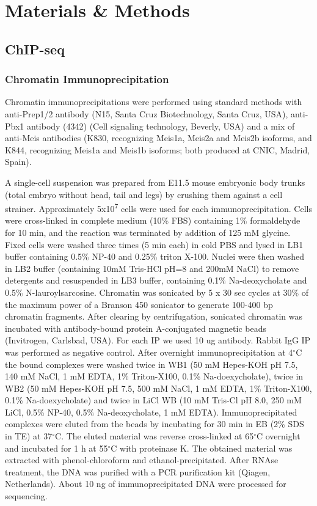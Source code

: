 \chapter{Materials \& Methods}
\thispagestyle{cleared}
\cleardoublepage
\label{chp:methods}

\section{ChIP-seq}
\subsection{Chromatin Immunoprecipitation}

Chromatin immunoprecipitations were performed using standard methods with anti-Prep1/2 antibody (N15, Santa Cruz Biotechnology, Santa Cruz, USA), anti-Pbx1 antibody (4342) (Cell signaling technology, Beverly, USA) and a mix of anti-Meis antibodies (K830, recognizing Meis1a, Meis2a and Meis2b isoforms, and K844, recognizing Meis1a and Meis1b isoforms; both produced at CNIC, Madrid, Spain). %

A single-cell suspension was prepared from E11.5 mouse embryonic body trunks (total embryo without head, tail and legs) by crushing them against a cell strainer. Approximately 5x10\textsuperscript{7} cells were used for each immunoprecipitation. Cells were cross-linked in complete medium (10\% FBS) containing 1\% formaldehyde for 10 min, and the reaction was terminated by addition of 125 mM glycine. Fixed cells were washed three times (5 min each) in cold PBS and lysed in LB1 buffer containing 0.5\% NP-40 and 0.25\% triton X-100. Nuclei were then washed in LB2 buffer (containing 10mM Tris-HCl pH=8 and 200mM NaCl) to remove detergents and resuspended in LB3 buffer, containing 0.1\% Na-deoxycholate and 0.5\% N-lauroylsarcosine. Chromatin was sonicated by 5 x 30 sec cycles at 30\% of the maximum power of a Branson 450 sonicator to generate 100-400 bp chromatin fragments. After clearing by centrifugation, sonicated chromatin was incubated with antibody-bound protein A-conjugated magnetic beads (Invitrogen, Carlsbad, USA). For each IP we used 10 ug antibody. Rabbit IgG IP was performed as negative control. After overnight immunoprecipitation at 4$^\circ$C the bound complexes were washed twice in WB1 (50 mM Hepes-KOH pH 7.5, 140 mM NaCl, 1 mM EDTA, 1\% Triton-X100, 0.1\% Na-doexycholate), twice in WB2 (50 mM Hepes-KOH pH 7.5, 500 mM NaCl, 1 mM EDTA, 1\% Triton-X100, 0.1\% Na-doexycholate) and twice in LiCl WB (10 mM Tris-Cl pH 8.0, 250 mM LiCl, 0.5\% NP-40, 0.5\% Na-deoxycholate, 1 mM EDTA). Immunoprecipitated complexes were eluted from the beads by incubating for 30 min in EB (2\% SDS in TE) at 37$^\circ$C. The eluted material was reverse cross-linked at 65$^\circ$C overnight and incubated for 1 h at 55$^\circ$C with proteinase K. The obtained material was extracted with phenol-chloroform and ethanol-precipitated. After RNAse treatment, the DNA was purified with a \ac{PCR} purification kit (Qiagen, Netherlands). About 10 ng of immunoprecipitated DNA were processed for sequencing.

